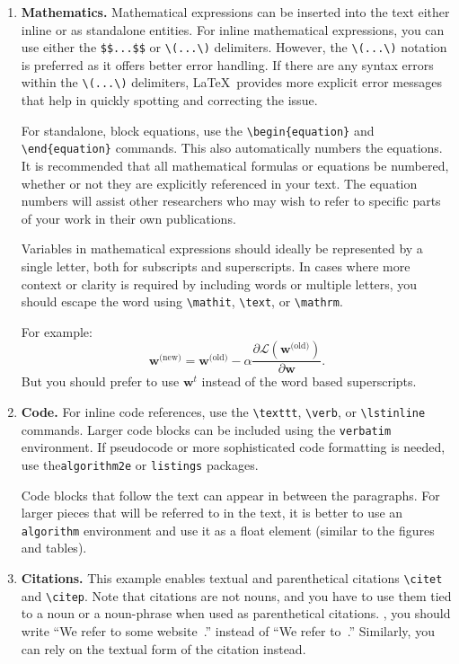 \documentclass[fullpaper]{nldl}
\begin{document}
\begin{enumerate}[leftmargin=*]
\item \textbf{Mathematics.}
Mathematical expressions can be inserted into the text either inline or as standalone entities. For inline mathematical expressions, you can use either the \verb|$$...$$| or \verb|\(...\)| delimiters.
However, the \verb|\(...\)| notation is preferred as it offers better error handling.
If there are any syntax errors within the \verb|\(...\)| delimiters, \LaTeX\ provides more explicit error messages that help in quickly spotting and correcting the issue.

For standalone, block equations, use the \verb|\begin{equation}| and \verb|\end{equation}| commands.
This also automatically numbers the equations.
It is recommended that all mathematical formulas or equations be numbered, whether or not they are explicitly referenced in your text.
The equation numbers will assist other researchers who may wish to refer to specific parts of your work in their own publications.


Variables in mathematical expressions should ideally be represented by a single letter, both for subscripts and superscripts.
In cases where more context or clarity is required by including words or multiple letters, you should escape the word using \verb|\mathit|, \verb|\text|, or \verb|\mathrm|.

For example:
\begin{equation}
  \mathbf{w}^{\text{(new)}} = \mathbf{w}^{\text{(old)}} - \alpha \frac{\partial \mathcal{L}(\mathbf{w}^{\text{(old)}})}{\partial \mathbf{w}}.
\end{equation}
But you should prefer to use $\mathbf{w}^{t}$ instead of the word based superscripts.

\item \textbf{Code.}
For inline code references, use the \verb|\texttt|, \verb|\verb|, or \verb|\lstinline| commands.
Larger code blocks can be included using the \verb|verbatim| environment.
If pseudocode or more sophisticated code formatting is needed, use the\verb|algorithm2e| or \verb|listings| packages.

Code blocks that follow the text can appear in between the paragraphs.
For larger pieces that will be referred to in the text, it is better to use an \verb|algorithm| environment and use it as a float element (similar to the figures and tables).

\item \textbf{Citations.}
This example enables textual and parenthetical citations \verb|\citet| and \verb|\citep|.
Note that citations are not nouns, and you have to use them tied to a noun or a noun-phrase when used as parenthetical citations.
\Eg, you should write ``We refer to some website~\citep{tromso}.''  instead of ``We refer to~\citep{tromso}.''
Similarly, you can rely on the textual form of the citation instead.


\end{enumerate}
\end{document}
